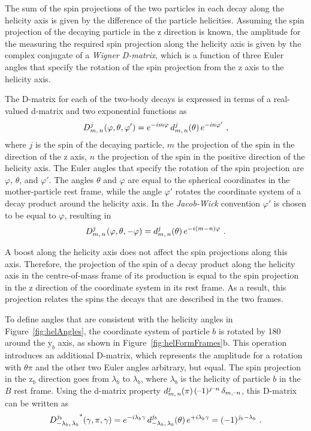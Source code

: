 The sum of the spin projections of the two particles in each decay along the helicity axis is given by the difference of the particle
helicities. Assuming the spin projection of the decaying particle in the z direction is known, the amplitude for the measuring the required
spin projection along the helicity axis is given by the complex conjugate of a \emph{Wigner D-matrix}, which is a function of three Euler
angles that specify the rotation of the spin projection from the z axis to the helicity axis.

The D-matrix for each of the two-body decays is expressed in terms of a real-valued d-matrix and two exponential functions as
\begin{equation}
  \label{eq:Ddef}
  \WD{j}{m}{n}{}(\varphi,\theta,\varphi') = e^{-im\varphi}\, \Wd{j}{m}{n}(\theta)\, e^{-in\varphi'}\ ,
\end{equation}
where $j$ is the spin of the decaying particle, $m$ the projection of the spin in the direction of the z axis, $n$ the projection of the
spin in the positive direction of the helicity axis. The Euler angles that specify the rotation of the spin projection are $\varphi$,
$\theta$, and $\varphi'$. The angles $\theta$ and $\varphi$ are equal to the spherical coordinates in the mother-particle rest frame, while
the angle $\varphi'$ rotates the coordinate system of a decay product around the helicity axis. In the \emph{Jacob-Wick} convention
$\varphi'$ is chosen to be equal to \tm$\varphi$, resulting in
\begin{equation}
  \label{eq:DdefJW}
  \WD{j}{m}{n}{}(\varphi,\theta,-\varphi) = \Wd{j}{m}{n}(\theta)\, e^{-i(m-n)\varphi}\ .
\end{equation}

A boost along the helicity axis does not affect the spin projections along this axis. Therefore, the projection of the spin of a decay
product along the helicity axis in the centre-of-mass frame of its production is equal to the spin projection in the z direction of the
coordinate system in its rest frame. As a result, this projection relates the spins the decays that are described in the two frames.

To define angles that are consistent with the helicity angles in Figure~\ref{fig:helAngles}, the coordinate system of particle $b$ is
rotated by 180\textdegree{} around the $\mathrm{y}_b$ axis, as shown in Figure~\ref{fig:helFormFrames}b. This operation introduces an
additional D-matrix, which represents the amplitude for a rotation with $\theta$\texteq$\pi$ and the other two Euler angles arbitrary, but
equal. The spin projection in the $\mathrm{z}_b$ direction goes from \tm$\lambda_b$ to \tp$\lambda_b$, where $\lambda_b$ is the helicity of
particle $b$ in the $B$ rest frame. Using the d-matrix property
$\Wd{j}{m}{n}(\pi)$\texteq$(\text{\tm1})^{j\text{\tm}n}\,\delta_{m,\text{\tm}n}$, this D-matrix can be written as
\begin{equation}
  \WD{j_b}{-\lambda_b}{\lambda_b}{*}(\gamma,\pi,\gamma)
      = e^{-i\lambda_b\gamma}\, \Wd{j_b}{-\lambda_b}{\lambda_b}(\theta)\, e^{+i\lambda_b\gamma}
      = (-1)^{j_b-\lambda_b}\ .
\end{equation}

